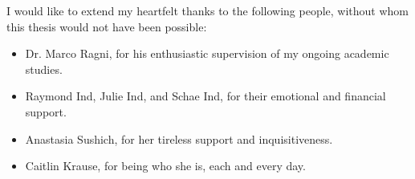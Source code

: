 \documentclass[
11pt, %
english, %
onehalfspacing,
headsepline, %
oneside]{MastersDoctoralThesis} %
\begin{document}

\mainmatter %

\pagestyle{thesis} %









%





\appendix %



\printbibliography[heading=bibintoc]




%
%


\begin{acknowledgements}
\addchaptertocentry{\acknowledgementname} %
I would like to extend my heartfelt thanks to the following people, without whom this thesis would not have been possible:
\begin{itemize}
\item Dr. Marco Ragni, for his enthusiastic supervision of my ongoing academic studies.
\item Raymond Ind, Julie Ind, and Schae Ind, for their emotional and financial support.
\item Anastasia Sushich, for her tireless support and inquisitiveness.
\item Caitlin Krause, for being who she is, each and every day.
\end{itemize}
\end{acknowledgements}
\end{document}
